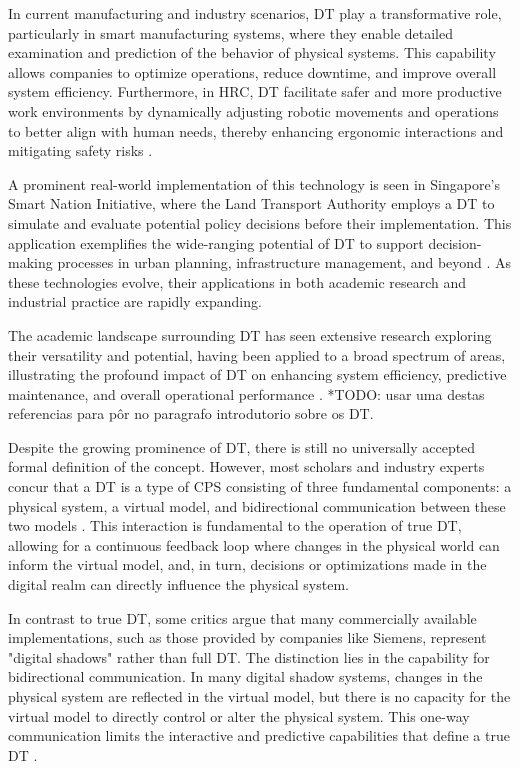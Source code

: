 In current manufacturing and industry scenarios, \ac{DT} play a transformative role, particularly in smart manufacturing systems, where they enable detailed examination and prediction of the behavior of physical systems. This capability allows companies to optimize operations, reduce downtime, and improve overall system efficiency. Furthermore, in \ac{HRC}, \ac{DT} facilitate safer and more productive work environments by dynamically adjusting robotic movements and operations to better align with human needs, thereby enhancing ergonomic interactions and mitigating safety risks \cite{8477101}.

A prominent real-world implementation of this technology is seen in Singapore's Smart Nation Initiative, where the Land Transport Authority employs a \ac{DT} to simulate and evaluate potential policy decisions before their implementation. This application exemplifies the wide-ranging potential of \ac{DT} to support decision-making processes in urban planning, infrastructure management, and beyond \cite{isprs-archives-XLII-4-W7-37-2017}. As these technologies evolve, their applications in both academic research and industrial practice are rapidly expanding.

The academic landscape surrounding \ac{DT} has seen extensive research exploring their versatility and potential, having been applied to a broad spectrum of areas, illustrating the profound impact of \ac{DT} on enhancing system efficiency, predictive maintenance, and overall operational performance \cite{8361285, TAO2018169, isprs-archives-XLII-4-W7-37-2017, 10.1007/978-3-030-23162-0_19, 6296978}.
*TODO: usar uma destas referencias para pôr no paragrafo introdutorio sobre os DT.

Despite the growing prominence of \ac{DT}, there is still no universally accepted formal definition of the concept. However, most scholars and industry experts concur that a \ac{DT} is a type of \ac{CPS} consisting of three fundamental components: a physical system, a virtual model, and bidirectional communication between these two models \cite{TaoFei, 8477101, ROSEN2015567}.
This interaction is fundamental to the operation of true \ac{DT}, allowing for a continuous feedback loop where changes in the physical world can inform the virtual model, and, in turn, decisions or optimizations made in the digital realm can directly influence the physical system.

In contrast to true \ac{DT}, some critics argue that many commercially available implementations, such as those provided by companies like Siemens, represent "digital shadows" rather than full \ac{DT}. The distinction lies in the capability for bidirectional communication. In many digital shadow systems, changes in the physical system are reflected in the virtual model, but there is no capacity for the virtual model to directly control or alter the physical system. This one-way communication limits the interactive and predictive capabilities that define a true DT \cite{CIMINO2019103130}.

